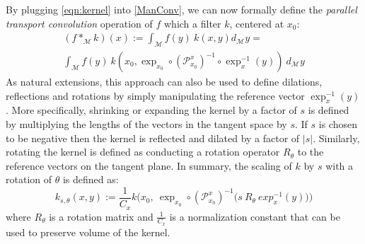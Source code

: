 \documentclass[10pt,twocolumn,letterpaper]{article}
\def\M{\mathcal{M}}
\def\PT{\mathcal{P}}
\begin{document}
By plugging \eqref{eqn:kernel} into \eqref{ManConv}, we can now formally define the {\it parallel transport convolution} operation of $f$ which a filter $k$, centered at $x_0$:
%
\begin{equation}
\begin{split}\label{ManConvRot}
(f *_{\M} k) (x) := \int_{\M} f(y)~k(x,y) d_\M y =  \\
\int_{\M} f(y) ~k\left(x_0, \exp_{x_0}\circ (\PT_{x_0}^{x})^{-1}\circ \exp_x^{-1}(y)\right) \ d_{\M}y
\end{split}
\end{equation}
%
As natural extensions, this approach can also be used to define dilations, reflections and rotations by simply manipulating the reference vector $\exp^{-1}_{x}(y)$. More specifically, shrinking or expanding the kernel by a factor of $s$ is defined by multiplying the lengths of the vectors in the tangent space by $s$. If $s$ is chosen to be negative then the kernel is reflected and dilated by a factor of $|s|$. Similarly, rotating the kernel is defined as conducting a rotation operator $R_{\theta}$ to the reference vectors on the tangent plane. In summary, the scaling of $k$ by $s$ with a rotation of $\theta$ is defined as:
%
\begin{equation}\label{RotandDil}
k_{s,\theta}(x,y) := \frac{1}{C_{x}} k\Big(x_0,\ \exp_{x_0}\circ (\PT_{x_0}^{x})^{-1}(s\  R_{\theta} \ exp^{-1}_{x}(y)\big)\Big)
\end{equation}
%
where $R_\theta$ is a rotation matrix and $\displaystyle \frac{1}{C_{x}}$ is a normalization constant that can be used to preserve volume of the kernel.
\end{document}
